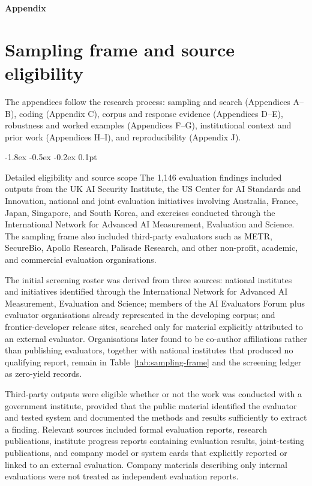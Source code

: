 \documentclass{article}
\makeatletter
\renewcommand{\subsection}{%
  \@startsection{subsection}{2}{\z@}%
                {-1.8ex \@plus -0.5ex \@minus -0.2ex}%
                {0.1pt}%
                {\normalsize\bf\raggedright}%
}
\makeatother
\begin{document}
\endgroup
\vspace{1em}
\appendix
\begin{center}
    {\LARGE\bfseries Appendix}
\end{center}
\vspace{0.5em}

\section{Sampling frame and source eligibility}\label{app:sampling}
The appendices follow the research process: sampling and search (Appendices A--B), coding (Appendix C), corpus and response evidence (Appendices D--E), robustness and worked examples (Appendices F--G), institutional context and prior work (Appendices H--I), and reproducibility (Appendix J).

\subsection{Detailed eligibility and source scope}
The 1,146 evaluation findings included outputs from the UK AI Security Institute, the US Center for AI Standards and Innovation, national and joint evaluation initiatives involving Australia, France, Japan, Singapore, and South Korea, and exercises conducted through the International Network for Advanced AI Measurement, Evaluation and Science. The sampling frame also included third-party evaluators such as METR, SecureBio, Apollo Research, Palisade Research, and other non-profit, academic, and commercial evaluation organisations.

The initial screening roster was derived from three sources: national institutes and initiatives identified through the International Network for Advanced AI Measurement, Evaluation and Science; members of the AI Evaluators Forum plus evaluator organisations already represented in the developing corpus; and frontier-developer release sites, searched only for material explicitly attributed to an external evaluator. Organisations later found to be co-author affiliations rather than publishing evaluators, together with national institutes that produced no qualifying report, remain in Table~\ref{tab:sampling-frame} and the screening ledger as zero-yield records.

Third-party outputs were eligible whether or not the work was conducted with a government institute, provided that the public material identified the evaluator and tested system and documented the methods and results sufficiently to extract a finding. Relevant sources included formal evaluation reports, research publications, institute progress reports containing evaluation results, joint-testing publications, and company model or system cards that explicitly reported or linked to an external evaluation. Company materials describing only internal evaluations were not treated as independent evaluation reports.
\end{document}
